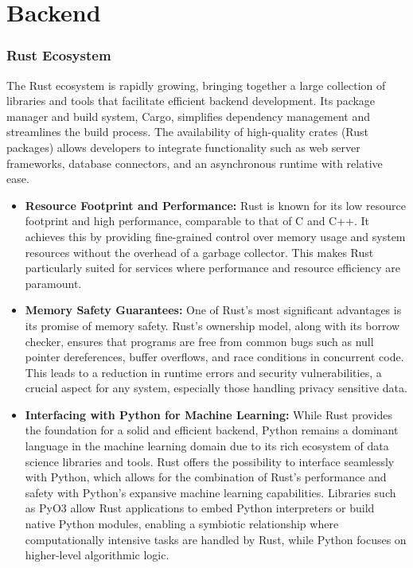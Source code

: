 \section{Backend}

\subsubsection{Rust Ecosystem}

The Rust ecosystem is rapidly growing, bringing together a large collection of libraries and tools that facilitate efficient backend development. Its package manager and build system, Cargo, simplifies dependency management and streamlines the build process. The availability of high-quality crates (Rust packages) allows developers to integrate functionality such as web server frameworks, database connectors, and an asynchronous runtime with relative ease.
\begin{itemize}
    \item \textbf{Resource Footprint and Performance:} Rust is known for its low resource footprint and high performance, comparable to that of C and C++. It achieves this by providing fine-grained control over memory usage and system resources without the overhead of a garbage collector. This makes Rust particularly suited for services where performance and resource efficiency are paramount.
    \item \textbf{Memory Safety Guarantees:} One of Rust’s most significant advantages is its promise of memory safety. Rust’s ownership model, along with its borrow checker, ensures that programs are free from common bugs such as null pointer dereferences, buffer overflows, and race conditions in concurrent code. This leads to a reduction in runtime errors and security vulnerabilities, a crucial aspect for any system, especially those handling privacy sensitive data.
    \item \textbf{Interfacing with Python for Machine Learning:} While Rust provides the foundation for a solid and efficient backend, Python remains a dominant language in the machine learning domain due to its rich ecosystem of data science libraries and tools. Rust offers the possibility to interface seamlessly with Python, which allows for the combination of Rust's performance and safety with Python's expansive machine learning capabilities. Libraries such as PyO3 \cite{PyO3PythonFromRust} allow Rust applications to embed Python interpreters or build native Python modules, enabling a symbiotic relationship where computationally intensive tasks are handled by Rust, while Python focuses on higher-level algorithmic logic.
\end{itemize}

